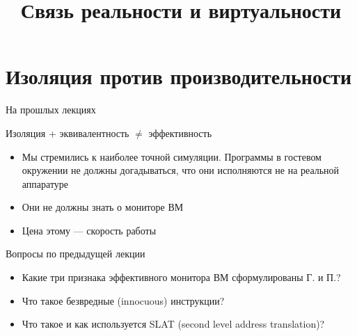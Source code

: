 
\title{Связь реальности и виртуальности}



\begin{frame}
    \maketitle
\end{frame}

\begin{frame}
    \tableofcontents
\end{frame}

\section[Изоляция]{Изоляция против производительности}

\begin{frame}{На прошлых лекциях}

Изоляция + эквивалентность $\neq$ эффективность

\begin{itemize}
\item Мы стремились к наиболее точной симуляции. Программы в гостевом окружении не должны догадываться, что они исполняются не на реальной аппаратуре
\item Они не должны знать о мониторе ВМ
\item Цена этому — скорость работы

\end{itemize}

\end{frame}

\begin{frame}{Вопросы по предыдущей лекции}

\begin{itemize}
\item Какие три признака эффективного монитора ВМ сформулированы Г. и П.?
\item Что такое безвредные (innocuous) инструкции?
\item Что такое и как используется SLAT (second level address translation)?


\end{itemize}

\end{frame}


